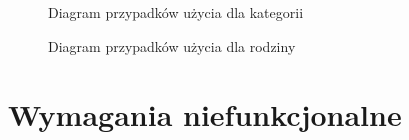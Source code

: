 \begin{figure}[p]
	\centering
	\caption{Diagram przypadków użycia dla kategorii}
	\label{fig:use-case-category}
\end{figure}

\begin{figure}[p]
	\centering
	\caption{Diagram przypadków użycia dla rodziny}
	\label{fig:use-case-family}
\end{figure}


\section{Wymagania niefunkcjonalne}
\label{sec:wymagania-niefunkcjonalne}

